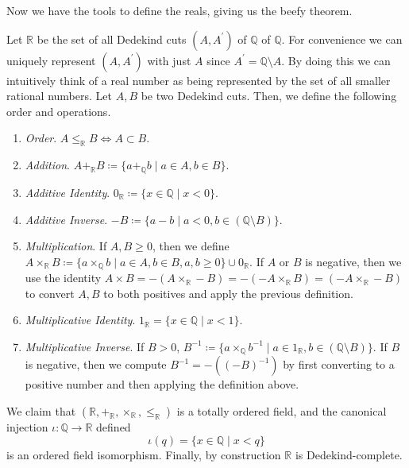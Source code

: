     Now we have the tools to define the reals, giving us the beefy theorem. 

    \begin{theorem}
      Let $\mathbb{R}$ be the set of all Dedekind cuts $(A, A^\prime)$ of $\mathbb{Q}$ of $\mathbb{Q}$. For convenience we can uniquely represent $(A, A^\prime)$ with just $A$ since $A^\prime = \mathbb{Q} \setminus A$. By doing this we can intuitively think of a real number as being represented by the set of all smaller rational numbers. Let $A, B$ be two Dedekind cuts. Then, we define the following order and operations. 
      \begin{enumerate}
        \item \textit{Order}. $A \leq_{\mathbb{R}} B \iff A \subset B$. 
        \item \textit{Addition}. $A +_{\mathbb{R}} B \coloneqq \{ a +_{\mathbb{Q}} b \mid a \in A, b \in B \}$. 
        \item \textit{Additive Identity}. $0_{\mathbb{R}} \coloneqq \{x \in \mathbb{Q} \mid x < 0 \}$. 
        \item \textit{Additive Inverse}. $-B \coloneqq \{ a - b \mid a < 0 , b \in (\mathbb{Q} \setminus B) \}$.
        \item \textit{Multiplication}. If $A, B \geq 0$, then we define $A \times_{\mathbb{R}} B \coloneqq \{ a \times_{\mathbb{Q}} b \mid a \in A, b \in B, a, b \geq 0\} \cup 0_{\mathbb{R}}$. If $A$ or $B$ is negative, then we use the identity $A \times B = -(A \times_{\mathbb{R}} -B) = -(-A \times_{\mathbb{R}} B) = (-A \times_{\mathbb{R}} -B)$ to convert $A, B$ to both positives and apply the previous definition. 
        \item \textit{Multiplicative Identity}. $1_{\mathbb{R}} = \{x \in \mathbb{Q} \mid x < 1 \}$. 
        \item \textit{Multiplicative Inverse}. If $B > 0$, $B^{-1} \coloneqq \{ a \times_{\mathbb{Q}} b^{-1} \mid a \in 1_{\mathbb{R}}, b \in (\mathbb{Q} \setminus B) \}$. If $B$ is negative, then we compute $B^{-1} = -((-B)^{-1})$ by first converting to a positive number and then applying the definition above. 
      \end{enumerate}
      We claim that $(\mathbb{R}, +_{\mathbb{R}}, \times_{\mathbb{R}}, \leq_{\mathbb{R}})$ is a totally ordered field, and the canonical injection $\iota: \mathbb{Q} \rightarrow \mathbb{R}$ defined 
      \begin{equation}
        \iota(q) = \{x \in \mathbb{Q} \mid x < q \}
      \end{equation}
      is an ordered field isomorphism. Finally, by construction $\mathbb{R}$ is Dedekind-complete. 
    \end{theorem} 

